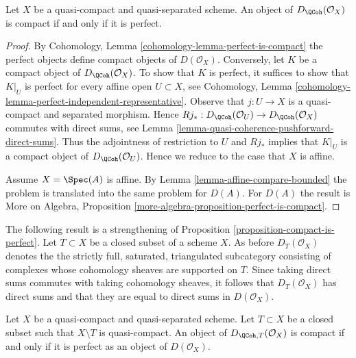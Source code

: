 \begin{proposition}
\label{proposition-compact-is-perfect}
Let $X$ be a quasi-compact and quasi-separated scheme.
An object of $D_\QCoh(\mathcal{O}_X)$ is compact
if and only if it is perfect.
\end{proposition}

\begin{proof}
By Cohomology, Lemma \ref{cohomology-lemma-perfect-is-compact}
the perfect objects define compact objects of $D(\mathcal{O}_X)$.
Conversely, let $K$ be a compact object of $D_\QCoh(\mathcal{O}_X)$.
To show that $K$ is perfect, it suffices to show that
$K|_U$ is perfect for every affine open $U \subset X$, see
Cohomology, Lemma \ref{cohomology-lemma-perfect-independent-representative}.
Observe that $j : U \to X$ is a quasi-compact and separated morphism.
Hence
$Rj_* : D_\QCoh(\mathcal{O}_U) \to D_\QCoh(\mathcal{O}_X)$
commutes with direct sums, see
Lemma \ref{lemma-quasi-coherence-pushforward-direct-sums}.
Thus the adjointness of restriction to $U$ and $Rj_*$ implies that
$K|_U$ is a compact object of $D_\QCoh(\mathcal{O}_U)$.
Hence we reduce to the case that $X$ is affine.

\medskip\noindent
Assume $X = \Spec(A)$ is affine. By Lemma \ref{lemma-affine-compare-bounded}
the problem is translated into the same problem for $D(A)$.
For $D(A)$ the result is
More on Algebra, Proposition \ref{more-algebra-proposition-perfect-is-compact}.
\end{proof}

\noindent
The following result is a strengthening of
Proposition \ref{proposition-compact-is-perfect}.
Let $T \subset X$ be a closed subset of a scheme $X$. As before
$D_T(\mathcal{O}_X)$ denotes the the strictly full, saturated,
triangulated subcategory consisting of complexes whose
cohomology sheaves are supported on $T$. Since taking direct
sums commutes with taking cohomology sheaves, it follows
that $D_T(\mathcal{O}_X)$ has direct sums and that they are equal
to direct sums in $D(\mathcal{O}_X)$.

\begin{lemma}
\label{lemma-compact-is-perfect-with-support}
Let $X$ be a quasi-compact and quasi-separated scheme.
Let $T \subset X$ be a closed subset such that $X \setminus T$
is quasi-compact. An object of $D_{\QCoh, T}(\mathcal{O}_X)$ is compact
if and only if it is perfect as an object of $D(\mathcal{O}_X)$.
\end{lemma}

